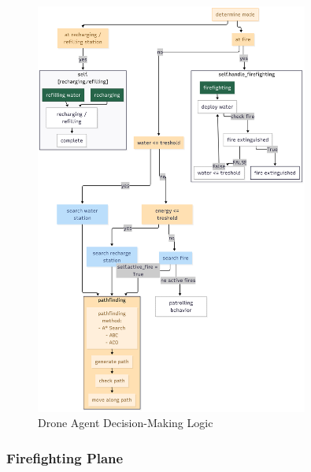 \documentclass[twoside]{article}
\begin{document}
\begin{figure}[!htbp]
  \centering
  \includegraphics[width=0.8\textwidth]{figures/DroneAgent_Logic.png}
  \caption{Drone Agent Decision-Making Logic}
  \label{fig:droneAgentlogic}
\end{figure}

\newpage
\subsubsection{Firefighting Plane}
\label{sec:PlaneAgent}
\end{document}
